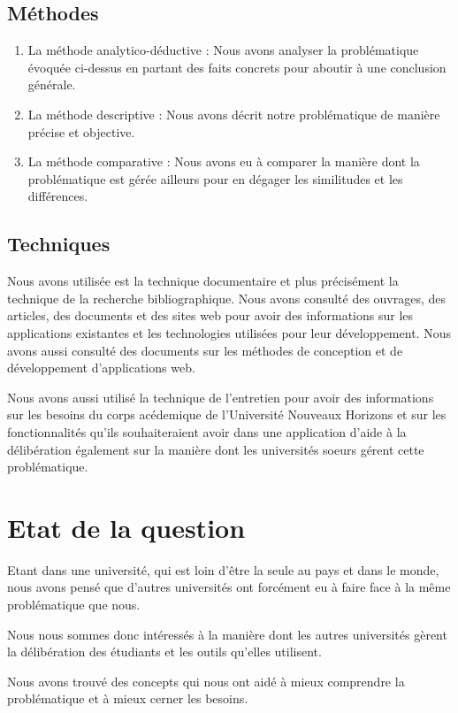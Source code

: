\subsection{Méthodes}
\begin{enumerate}
    \item La méthode analytico-déductive : Nous avons analyser la problématique évoquée ci-dessus en partant des faits concrets pour aboutir à une conclusion générale.
    \item La méthode descriptive : Nous avons décrit notre problématique de manière précise et objective.
    \item La méthode comparative : Nous avons eu à comparer la manière dont la problématique est gérée ailleurs pour en dégager les similitudes et les différences.
\end{enumerate}

\subsection{Techniques}
Nous avons utilisée est la technique documentaire et
plus précisément la technique de la recherche bibliographique. Nous avons
consulté des ouvrages, des articles, des documents et des sites web
pour avoir des informations sur les applications existantes et les
technologies utilisées pour leur développement. Nous avons aussi
consulté des documents sur les méthodes de conception et de
développement d'applications web.

Nous avons aussi utilisé la technique de l'entretien pour
avoir des informations sur les besoins du corps acédemique de
l'Université Nouveaux Horizons et
sur les fonctionnalités qu'ils souhaiteraient avoir
dans une application d'aide à la délibération également sur la
manière dont les universités soeurs gérent cette problématique.

\section{Etat de la question}\label{sec:etat-de-l-art}
Etant dans une université, qui est loin d'être la seule
au pays et dans le monde, nous avons pensé que d'autres universités
ont forcément eu à faire face à la même problématique que nous.

Nous nous sommes donc intéressés à la manière dont les autres universités
gèrent la délibération des étudiants et les outils qu'elles utilisent.

Nous avons trouvé des concepts qui nous ont aidé à mieux
comprendre la problématique et à mieux cerner les besoins.

